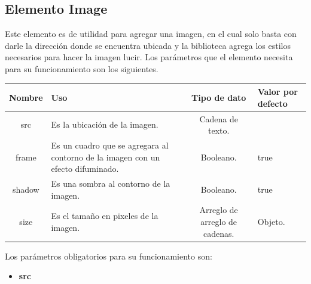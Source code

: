 \subsection{Elemento Image}
Este elemento es de utilidad para agregar una imagen, en el cual solo basta con darle la dirección donde se encuentra ubicada y la biblioteca agrega los estilos necesarios para hacer la imagen lucir.
Los parámetros que el elemento necesita para su funcionamiento son los siguientes.
\newline
    \newline
    \begin{center}
     \begin{tabular}{ | c |  p{5cm}  | c | p{3cm} |} 
     \hline
     \textbf{Nombre} &  \textbf{Uso} &  \textbf{ Tipo de dato} &  \textbf{Valor por defecto}\\ [0.5ex] 
     \hline\hline
     src &  Es la ubicación de la imagen. &   Cadena de texto. & \\  [2.5ex] 
     \hline
     frame &  Es un cuadro que se agregara al contorno de la imagen con un efecto difuminado. &   Booleano. & true \\  [2.5ex] 
     \hline
      shadow &  Es una sombra al contorno de la imagen. &   Booleano. & true \\  [2.5ex] 
     \hline
     size &  Es el tamaño en pixeles de la imagen. &   Arreglo de arreglo de cadenas. & Objeto. \\  [2.5ex] 
     \hline
    \end{tabular}
    \end{center}
    \newline
                \newline
Los parámetros obligatorios para su funcionamiento son:
\begin{itemize}
\item \textbf{src} 
\end{itemize}
\newline
    \newline
